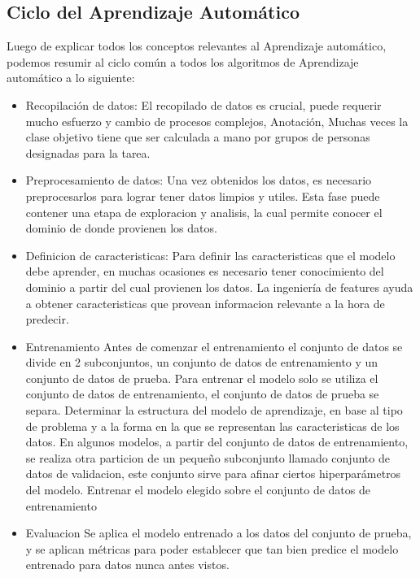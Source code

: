 \documentclass[a4paper,11pt,spanish]{book}
\begin{document}
    \subsection{Ciclo del Aprendizaje Automático}
      Luego de explicar todos los conceptos relevantes al Aprendizaje automático, podemos resumir al ciclo común a todos los algoritmos de Aprendizaje automático a lo siguiente: 
      \begin{itemize}
	\item Recopilación de datos:
	  El recopilado de datos es crucial, puede requerir mucho esfuerzo y cambio de procesos complejos, 
	  Anotación, Muchas veces la clase objetivo tiene que ser calculada a mano por grupos de personas designadas para la tarea.
	\item Preprocesamiento de datos: Una vez obtenidos los datos, es necesario preprocesarlos para lograr tener datos limpios y utiles. Esta fase puede contener una etapa 
	  de exploracion y analisis, la cual permite conocer el dominio de donde provienen los datos.  
	\item Definicion de caracteristicas: Para definir las caracteristicas que el modelo debe aprender, en muchas ocasiones es necesario tener conocimiento del dominio a partir del cual provienen los datos. 
	  La ingeniería de features ayuda a obtener caracteristicas que provean informacion relevante a la hora de predecir.
	\item Entrenamiento
	  \subitem Antes de comenzar el entrenamiento el conjunto de datos se divide en 2 subconjuntos, un conjunto de datos de entrenamiento y un conjunto de datos de prueba. 
	  \subitem Para entrenar el modelo solo se utiliza el conjunto de datos de entrenamiento, el conjunto de datos de prueba se separa.
	  \subitem Determinar la estructura del modelo de aprendizaje, en base al tipo de problema y a la forma en la que se representan las caracteristicas de los datos.
	  \subitem En algunos modelos, a partir del conjunto de datos de entrenamiento, se realiza otra particion de un pequeño subconjunto llamado conjunto de datos de validacion, este conjunto sirve 
	  para afinar ciertos hiperparámetros del modelo.
	  \subitem Entrenar el modelo elegido sobre el conjunto de datos de entrenamiento
	\item Evaluacion
	  Se aplica el modelo entrenado a los datos del conjunto de prueba, y se aplican métricas para poder establecer que tan bien predice el modelo entrenado para datos nunca antes vistos.
      \end{itemize}
\end{document}
